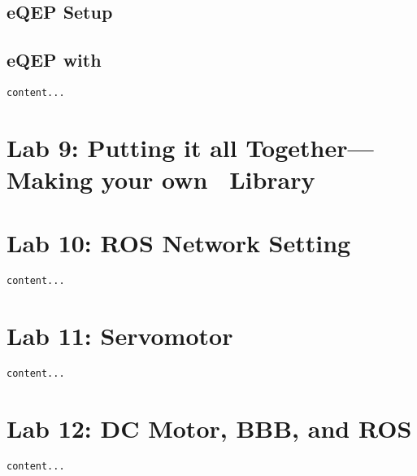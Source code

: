 \documentclass{article}
\let\Oldsection\section
\renewcommand{\section}{\FloatBarrier\Oldsection}
\let\Oldsubsection\subsection
\renewcommand{\subsection}{\FloatBarrier\Oldsubsection}
\def\CC{{C\nolinebreak[4]\hspace{-.05em}\raisebox{.4ex}{\tiny\bf ++}}}
\begin{document}
	\subsection{ eQEP Setup}
	\subsection{ eQEP with \protect\CC}
	\begin{lstlisting}[style=C++Style]
	content...
	\end{lstlisting}
	
\clearpage
\section{Lab 9: Putting it all Together---Making your own \protect\CC ~Library}


\clearpage
\section{Lab 10: ROS Network Setting}
\begin{lstlisting}[style=C++Style]
content...
\end{lstlisting}

\clearpage
\section{Lab 11: Servomotor}
\begin{lstlisting}[style=C++Style]
content...
\end{lstlisting}

\clearpage
\section{Lab 12: DC Motor, BBB, and ROS}
\begin{lstlisting}[style=C++Style]
content...
\end{lstlisting}
\end{document}
